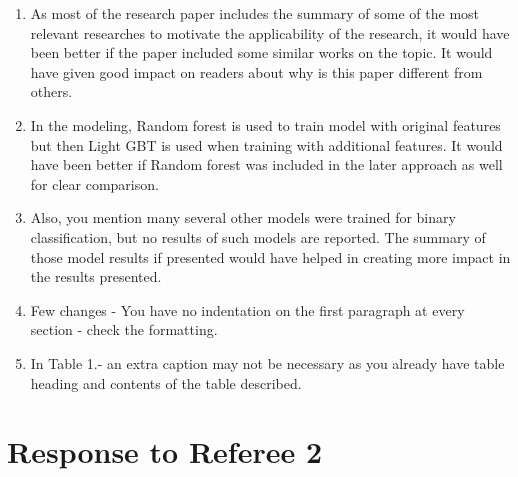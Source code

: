 \documentclass{amsart}[12pt]
\begin{document}
\begin{enumerate}
    \item   {\color{blue}
        As most of the research paper includes the summary of some of the most relevant researches to motivate the applicability of the research, it would have been better if the paper included some similar works on the topic.
        It would have given good impact on readers about why is this paper different from others. 
        }\\
    \item   {\color{blue}
        In the modeling, Random forest is used to train model with original features but then Light GBT is used when training with additional features. It would have been better if Random forest was included in the later approach as well for clear comparison. 
        }\\

    \item   {\color{blue}
   Also, you mention many several other models were trained for binary classification, but no results of such models are reported. The summary of those model results if presented would have helped in creating more impact in the results presented. 
        }\\
    \item   {\color{blue}
        Few changes - You have no indentation on the first paragraph at every section - check the formatting. 
        }\\

    \item   {\color{blue}
        In Table 1.- an extra caption may not be necessary as you already have table heading and contents of the table described. 
        }\\
\end{enumerate}

\section{Response to Referee 2}
\end{document}
